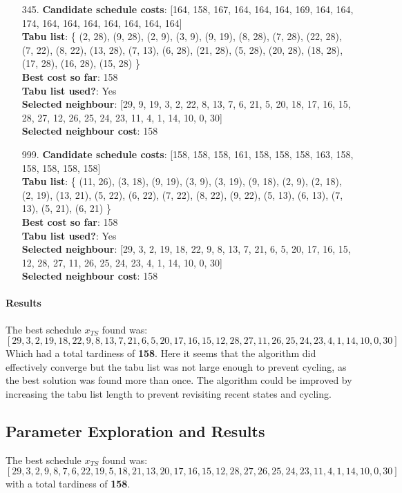 \documentclass[fleqn]{article}
\begin{document}
\begin{itemize}
    \item[345.] \textbf{Candidate schedule costs}: [164, 158, 167, 164, 164, 164, 169, 164, 164, 174, 164, 164, 164, 164, 164, 164, 164] \\
    \textbf{Tabu list}: \{ (2, 28), (9, 28), (2, 9), (3, 9), (9, 19), (8, 28), (7, 28), (22, 28), (7, 22), (8, 22), (13, 28), (7, 13), (6, 28), (21, 28), (5, 28), (20, 28), (18, 28), (17, 28), (16, 28), (15, 28) \} \\
    \textbf{Best cost so far}: 158 \\
    \textbf{Tabu list used?}: Yes \\
    \textbf{Selected neighbour}: [29, 9, 19, 3, 2, 22, 8, 13, 7, 6, 21, 5, 20, 18, 17, 16, 15, 28, 27, 12, 26, 25, 24, 23, 11, 4, 1, 14, 10, 0, 30] \\
    \textbf{Selected neighbour cost}: 158

    \item[999.] \textbf{Candidate schedule costs}: [158, 158, 158, 161, 158, 158, 158, 163, 158, 158, 158, 158, 158] \\
    \textbf{Tabu list}: \{ (11, 26), (3, 18), (9, 19), (3, 9), (3, 19), (9, 18), (2, 9), (2, 18), (2, 19), (13, 21), (5, 22), (6, 22), (7, 22), (8, 22), (9, 22), (5, 13), (6, 13), (7, 13), (5, 21), (6, 21) \} \\
    \textbf{Best cost so far}: 158 \\
    \textbf{Tabu list used?}: Yes \\
    \textbf{Selected neighbour}: [29, 3, 2, 19, 18, 22, 9, 8, 13, 7, 21, 6, 5, 20, 17, 16, 15, 12, 28, 27, 11, 26, 25, 24, 23, 4, 1, 14, 10, 0, 30] \\
    \textbf{Selected neighbour cost}: 158
  \end{itemize}

  \paragraph{Results}
  The best schedule $x_{TS}$ found was:
  \[
    [29, 3, 2, 19, 18, 22, 9, 8, 13, 7, 21, 6, 5, 20, 17, 16, 15, 12, 28, 27, 11, 26, 25, 24, 23, 4, 1, 14, 10, 0, 30]
  \]
  Which had a total tardiness of \textbf{158}.
  Here it seems that the algorithm did effectively converge but the tabu list was not large enough to prevent cycling, as the best solution was found more than once.
  The algorithm could be improved by increasing the tabu list length to prevent revisiting recent states and cycling.

  \subsection{Parameter Exploration and Results}
    The best schedule $x_{TS}$ found was:
    \[
      [29, 3, 2, 9, 8, 7, 6, 22, 19, 5, 18, 21, 13, 20, 17, 16, 15, 12, 28, 27, 26, 25, 24, 23, 11, 4, 1, 14, 10, 0, 30]
    \]
    with a total tardiness of \textbf{158}.
\end{document}
